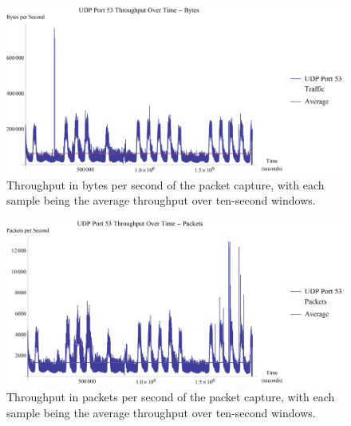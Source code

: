 \documentclass[12pt]{report}
\theoremstyle{remark}
\theoremstyle{definition}
\theoremstyle{definition}
\theoremstyle{definition}
\begin{document}
\begin{appendices}
\begin{figure}
\centering
\includegraphics[width=\textwidth]{../figures/pcap-tpb.png}
\caption[Throughput in Bytes per Second of Packet Capture]{Throughput in bytes per second of the packet capture, with each sample being the average throughput over ten-second windows.}
\label{pcap-tpb}
\end{figure}

\begin{figure}
\centering
\includegraphics[width=\textwidth]{../figures/pcap-tpp.png}
\caption[Throughput in Packets per Second of Packet Capture]{Throughput in packets per second of the packet capture, with each sample being the average throughput over ten-second windows.}
\label{pcap-tpp}
\end{figure}





\end{appendices}
\end{document}
